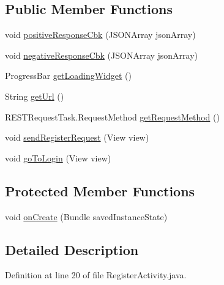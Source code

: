 \subsection*{Public Member Functions}
\begin{DoxyCompactItemize}
\item 
void \hyperlink{classcom_1_1bartekcios_1_1ticketsclient_1_1_register_activity_ac6ff244e4175ca87432b78be7c507d66}{positive\+Response\+Cbk} (J\+S\+O\+N\+Array json\+Array)
\item 
void \hyperlink{classcom_1_1bartekcios_1_1ticketsclient_1_1_register_activity_a113d57256d6e0e501b9c09f153bc42dc}{negative\+Response\+Cbk} (J\+S\+O\+N\+Array json\+Array)
\item 
Progress\+Bar \hyperlink{classcom_1_1bartekcios_1_1ticketsclient_1_1_register_activity_a9e9e4809b906f4cc40206841cf037117}{get\+Loading\+Widget} ()
\item 
String \hyperlink{classcom_1_1bartekcios_1_1ticketsclient_1_1_register_activity_a2090c93d14ba708273bbc4c82665ce91}{get\+Url} ()
\item 
R\+E\+S\+T\+Request\+Task.\+Request\+Method \hyperlink{classcom_1_1bartekcios_1_1ticketsclient_1_1_register_activity_a6b8d2934c8ccad249d89addd9b73a3b4}{get\+Request\+Method} ()
\item 
void \hyperlink{classcom_1_1bartekcios_1_1ticketsclient_1_1_register_activity_a3cb03995bb1c04e245507d87269d19a3}{send\+Register\+Request} (View view)
\item 
void \hyperlink{classcom_1_1bartekcios_1_1ticketsclient_1_1_register_activity_ab9e71c9075abb94faa23384657fbfb63}{go\+To\+Login} (View view)
\end{DoxyCompactItemize}
\subsection*{Protected Member Functions}
\begin{DoxyCompactItemize}
\item 
void \hyperlink{classcom_1_1bartekcios_1_1ticketsclient_1_1_register_activity_a324e417414b6381d22e58a663caf5d39}{on\+Create} (Bundle saved\+Instance\+State)
\end{DoxyCompactItemize}


\subsection{Detailed Description}


Definition at line 20 of file Register\+Activity.\+java.



